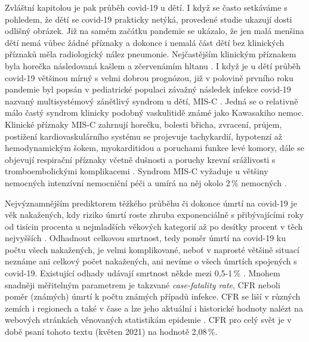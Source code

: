 Zvláštní kapitolou je pak průběh covid-19 u dětí. I když se často setkáváme s pohledem, že dětí se covid-19 prakticky netýká, provedené studie ukazují dosti odlišný obrázek. Již na samém začátku pandemie se ukázalo, že jen malá menšina dětí nemá vůbec žádné příznaky a dokonce i nemalá část dětí bez klinických příznaků měla radiologický nález pneumonie. Nejčastějším klinickým příznakem byla horečka následovaná kašlem a zčervenámím hltanu \cite{Lu:2020b}. I když je u dětí průběh covid-19 většinou mírný s velmi dobrou prognózou, již v polovině prvního roku pandemie byl popsán v pediatrické populaci závažný následek infekce covid-19 nazvaný multisystémový zánětlivý syndrom u dětí, MIS-C \cite{Feldstein:2020}. Jedná se o relativně málo častý syndrom klinicky podobný vaskulitidě známé jako Kawasakiho nemoc. Klinické příznaky MIS-C zahrnují horečku, bolesti břicha, zvracení, průjem, postižení kardiovaskulárního systému se projevuje tachykardií, hypotenzí až hemodynamickým šokem, myokarditidou a poruchami funkce levé komory, dále se objevují respirační příznaky včetně dušnosti a poruchy krevní srážlivosti s tromboembolickými komplikacemi \cite{Hoste:2021}. Syndrom MIS-C vyžaduje u většiny nemocných intenzívní nemocniční péči a umírá na něj okolo 2\,\% nemocných \cite{Hoste:2021}.

Nejvýznamnějším prediktorem těžkého průběhu či dokonce úmrtí na covid-19 je věk nakažených, kdy riziko úmrtí roste zhruba exponenciálně s přibývajícími roky od tisícin procenta u nejmladších věkových kategorií až po desítky procent v těch nejvyšších \cite{ODriscoll:2020}. Odhadnout celkovou smrtnost, tedy poměr úmrtí na covid-19 ku počtu všech nakažených, je velmi komplikované, neboť v naprosté většině situací neznáme ani celkový počet nakažených, ani nevíme o všech úmrtích spojených s covid-19. Existující odhady udávají smrtnost někde mezi 0,5-1\,\% \cite{Meyerowitz-Katz:2020}. Mnohem snadněji měřitelným parametrem je takzvané \textit{case-fatality rate}, CFR neboli poměr (známých) úmrtí k počtu známých případů infekce. CFR se liší v různých zemích i regionech a také v čase a lze jeho aktuální i historické hodnoty nalézt na webových stránkách věnovaných statistikám epidemie \cite{owidcoronavirus}. CFR pro celý svět je v době psaní tohoto textu (květen 2021) na hodnotě 2,08\,\%.

